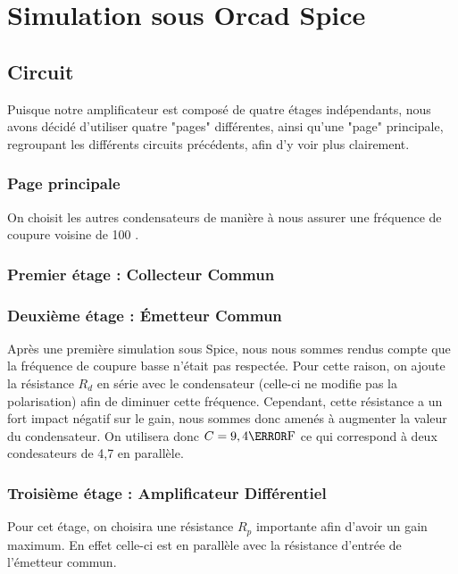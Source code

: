  \chapter{Simulation sous Orcad Spice}
  \section{Circuit}
    Puisque notre amplificateur est composé de quatre étages indépendants, nous avons décidé d'utiliser quatre "pages"
    différentes, ainsi qu'une "page"  principale, regroupant les différents circuits précédents, afin d'y voir plus clairement.

   \subsection{Page principale}
    On choisit les autres condensateurs de manière à nous assurer une fréquence de coupure voisine de 100 \hertz.

   \subsection{Premier étage : Collecteur Commun}

   \subsection{Deuxième étage : Émetteur Commun}

    Après une première simulation sous Spice, nous nous sommes rendus compte que la fréquence de coupure basse n'était pas respectée.
    Pour cette raison, on ajoute la résistance $R_d$ en série avec le condensateur (celle-ci ne modifie pas la polarisation) afin de diminuer cette fréquence.
    Cependant, cette résistance a un fort impact négatif sur le gain, nous sommes donc amenés à augmenter la valeur du condensateur. On utilisera donc $C=9,4 \micro\farad$  ce qui correspond à deux condesateurs de 4,7 \micro\farad  en parallèle.

   \subsection{Troisième étage : Amplificateur Différentiel}

    Pour cet étage, on choisira une résistance $R_p$ importante afin d'avoir un gain maximum.
    En effet celle-ci est en parallèle avec la résistance d'entrée de l'émetteur commun.


